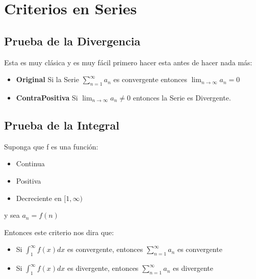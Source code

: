 \documentclass[12pt]{report}                                %
\begin{document}
\clearpage
\chapter{Criterios en Series}

    \clearpage
    \section{Prueba de la Divergencia}
        Esta es muy clásica y es muy fácil primero hacer esta antes
        de hacer nada más:

        \begin{itemize}
            \item \textbf{Original} Si la Serie $\sum_{n=1}^{\infty} a_n$ es
            convergente entonces $\lim_{n \to \infty} a_n = 0$

            \item \textbf{ContraPositiva} Si $\lim_{n \to \infty} a_n \neq 0$ entonces la Serie es Divergente.
        \end{itemize}

    \clearpage
    \section{Prueba de la Integral}
        Suponga que f es una función:

        \begin{itemize}
            \item Continua
            \item Positiva
            \item Decreciente en $[1, \infty)$
        \end{itemize}

        y sea $a_n = f(n)$

        Entonces este criterio nos dira que:
        \begin{itemize}
           \item Si $\int_1^{\infty}f(x) dx$ es convergente, entonces $\sum_{n=1}^{\infty} a_n$ es convergente
           \item Si $\int_1^{\infty}f(x) dx$ es divergente, entonces $\sum_{n=1}^{\infty} a_n$ es divergente
        \end{itemize}
\end{document}
